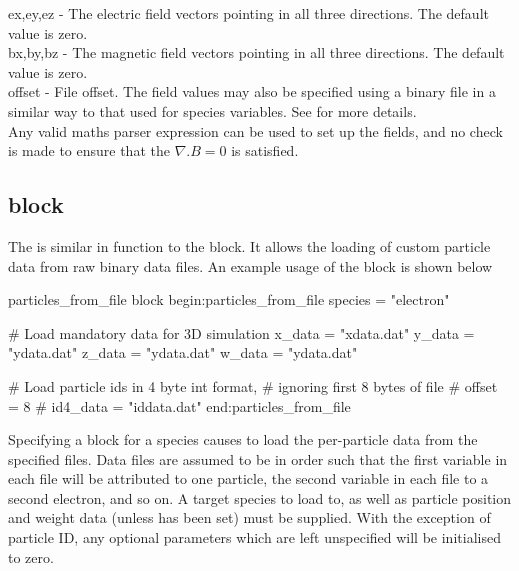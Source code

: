 {\emphtext ex,\;ey,\;ez} - The electric field vectors pointing in all three
directions. The default value is zero.\\

{\emphtext bx,\;by,\;bz} - The magnetic field vectors pointing in all three
directions. The default value is zero.\\

{\emphtext offset} - File offset. The field values may also be specified using
a binary file in a similar way to that used for species variables. See
 for more details.\\

Any valid maths parser expression can be used to set up the fields, and no
check is made to ensure that the $\nabla.B = 0$ is satisfied.


\subsection{\texorpdfstring
  { block}
  {           {particles\_from\_file} block}}
\label{sec:particles_from_file}
The  is similar in function to the
 block. It allows the loading of custom particle data from raw
binary data files. An example usage of the block is shown below
\begin{lboxverbatim}{particles\_from\_file block}
begin:particles_from_file
   species = "electron"

   # Load mandatory data for 3D simulation
   x_data = "xdata.dat"
   y_data = "ydata.dat"
   z_data = "ydata.dat"
   w_data = "ydata.dat"

   # Load particle ids in 4 byte int format,
   # ignoring first 8 bytes of file
   # offset = 8
   # id4_data = "iddata.dat"
end:particles_from_file
\end{lboxverbatim}

Specifying a  block for a species causes {\EPOCH}
to load the per-particle data from the specified files. Data files are assumed
to be in order such that the first variable in each file will be attributed to
one particle, the second variable in each file to a second electron, and so on.
A target species to load to, as well as particle position and weight data
(unless  has been set) must be supplied.
With the exception of particle ID, any optional parameters which are left
unspecified will be initialised to zero.\\

